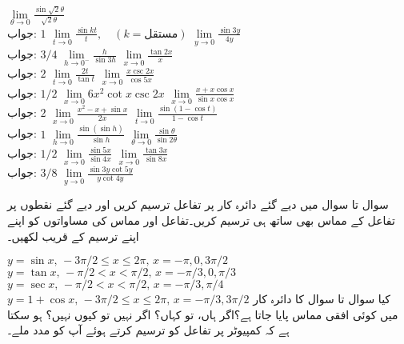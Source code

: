 $\lim\limits_{\theta\to 0}\tfrac{\sin \sqrt{2}\theta}{\sqrt{2}\theta}$\\
جواب:\quad
$1$
$\lim\limits_{t\to 0}\tfrac{\sin kt}{t},\quad (k=\text{مستقل})$
$\lim\limits_{y\to 0}\tfrac{\sin 3y}{4y}$\\
جواب:\quad
$3/4$
$\lim\limits_{h\to 0^-} \tfrac{h}{\sin 3h}$
$\lim\limits_{x \to 0} \tfrac{\tan 2x}{x}$\\
جواب:\quad
$2$
$\lim\limits_{t\to 0}\tfrac{2t}{\tan t}$
$\lim\limits_{x\to 0}\tfrac{x\csc 2x}{\cos 5x}$\\
جواب:\quad
$1/2$
$\lim\limits_{x\to 0}6x^2\cot x\csc 2x$
$\lim\limits_{x\to 0} \tfrac{x+x\cos x}{\sin x\cos x}$\\
جواب:\quad
$2$
$\lim\limits_{x\to0}\tfrac{x^2-x+\sin x}{2x}$
$\lim\limits_{t\to0} \tfrac{\sin(1-\cos t)}{1-\cos t}$\\
جواب:\quad
$1$
$\lim\limits_{h\to 0}\tfrac{\sin (\sin h)}{\sin h}$
$\lim\limits_{\theta \to 0}\tfrac{\sin \theta}{\sin 2\theta}$\\
جواب:\quad
$1/2$
$\lim\limits_{x\to0}\tfrac{\sin 5x}{\sin 4x}$
$\lim\limits_{x\to 0}\tfrac{\tan 3x}{\sin 8x}$\\
جواب:\quad
$3/8$
$\lim\limits_{y\to 0}\tfrac{\sin 3y\cot 5y}{y\cot 4y}$

سوال  تا سوال  میں دیے گئے دائرہ کار پر تفاعل ترسیم کریں اور دیے گئے نقطوں پر تفاعل کے مماس بھی ساتھ ہی ترسیم کریں۔تفاعل اور مماس کی مساواتوں کو اپنے اپنے ترسیم کے قریب لکھیں۔

$y=\sin x,\, -3\pi/2\le x\le 2\pi,\, x=-\pi,0,3\pi/2$
$y=\tan x,\, -\pi/2<x<\pi/2,\,x=-\pi/3,0,\pi/3$
$y=\sec x,\, -\pi/2<x<\pi/2,\, x=-\pi/3,\pi/4$
$y=1+\cos x,\, -3\pi/2\le x\le 2\pi,\, x=-\pi/3,3\pi/2$
کیا سوال  تا سوال  کا دائرہ کار  میں کوئی افقی مماس پایا جاتا ہے؟اگر ہاں، تو کہاں؟ اگر نہیں تو کیوں نہیں؟ ہو سکتا ہے کہ کمپیوٹر پر تفاعل کو ترسیم کرتے ہوئے آپ کو مدد ملے۔

